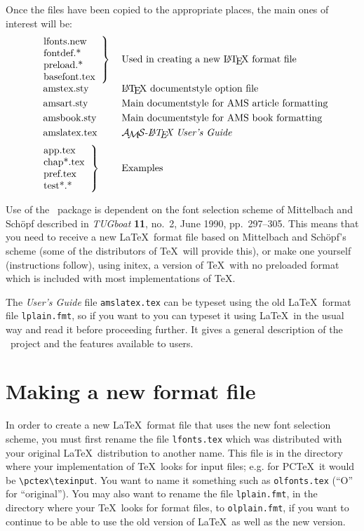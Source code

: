 Once the files have been copied to the appropriate places, the
main ones of interest will be:
\[\begin{tabular}{ll}
$\left.\begin{tabular}{l}
lfonts.new\\ fontdef.*\\ preload.*\\ basefont.tex
\end{tabular}\right\}$&
        Used in creating a new \LaTeX\ format file\\[6pt]
\ \ amstex.sty&
        \LaTeX\ documentstyle option file\\[3pt]
\ \ amsart.sty&
        Main documentstyle for AMS article formatting\\[3pt]
\ \ amsbook.sty&
        Main documentstyle for AMS book formatting\\[3pt]
\ \ amslatex.tex&
        {\it\amslatex\ User's Guide}\\[6pt]
$\left.\begin{tabular}{l}
app.tex\\ chap*.tex\\ pref.tex\\ test*.*
\end{tabular}\right\}$&
Examples
\end{tabular}\]

Use of the \amslatex\ package is dependent on the font selection scheme of
Mittelbach and Sch\"opf described in {\it TUGboat} {\bf 11}, no.~2, June
1990, pp.~297--305. 
This means that you need to receive a new \LaTeX\ format file based on
Mittelbach and Sch\"opf's scheme (some of the distributors of \TeX\ will
provide this), or make one yourself (instructions follow), using {\sc initex},
a version of \TeX\ with no preloaded format which is included with most
implementations of \TeX.

The {\it User's Guide} file \verb+amslatex.tex+ can be typeset using the old
\LaTeX\ format file \verb+lplain.fmt+, so if you want to you can typeset it
using \LaTeX\  in the usual way and read it before proceeding further.  It
gives a general description of the \amslatex\ project and the features
available to users.

\section{Making a new format file}

In order to create a new \LaTeX\ format file that uses the new font selection
scheme, you must first rename the file \verb+lfonts.tex+ which was distributed
with your original \LaTeX\ distribution to another name. This file is in the
directory where your implementation of \TeX\ looks for input files; e.g. for
PC\TeX\ it would be  \verb+\pctex\texinput+. You want to name it something 
such as \verb+olfonts.tex+ (``O'' for ``original'').  You may also want to
rename the file \verb+lplain.fmt+, in the directory where your \TeX\ looks for
format files, to \verb+olplain.fmt+,  if you want to continue to be able to use
the old version of \LaTeX\ as well as the new version.

